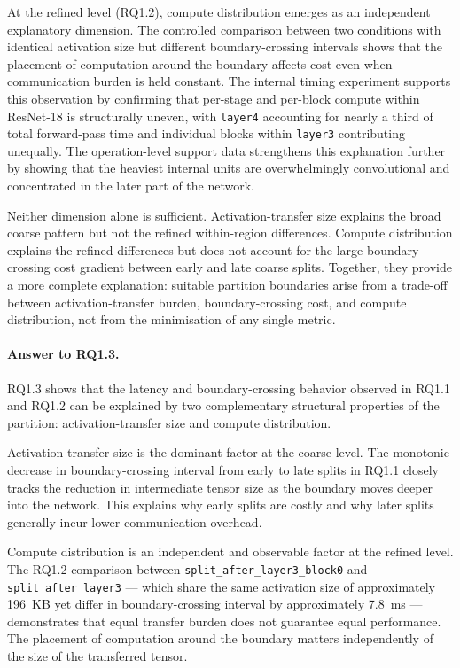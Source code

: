At the refined level (RQ1.2), compute distribution emerges as an independent
explanatory dimension. The controlled comparison between two conditions with
identical activation size but different boundary-crossing intervals shows that
the placement of computation around the boundary affects cost even when
communication burden is held constant. The internal timing experiment supports
this observation by confirming that per-stage and per-block compute within
ResNet-18 is structurally uneven, with \texttt{layer4} accounting for nearly a
third of total forward-pass time and individual blocks within \texttt{layer3}
contributing unequally. The operation-level support data strengthens this
explanation further by showing that the heaviest internal units are
overwhelmingly convolutional and concentrated in the later part of the network.

Neither dimension alone is sufficient. Activation-transfer size explains the
broad coarse pattern but not the refined within-region differences. Compute
distribution explains the refined differences but does not account for the
large boundary-crossing cost gradient between early and late coarse splits.
Together, they provide a more complete explanation: suitable partition
boundaries arise from a trade-off between activation-transfer burden,
boundary-crossing cost, and compute distribution, not from the minimisation of
any single metric.

\paragraph{Answer to RQ1.3.}
RQ1.3 shows that the latency and boundary-crossing behavior observed in RQ1.1
and RQ1.2 can be explained by two complementary structural properties of the
partition: activation-transfer size and compute distribution.

Activation-transfer size is the dominant factor at the coarse level. The
monotonic decrease in boundary-crossing interval from early to late splits in
RQ1.1 closely tracks the reduction in intermediate tensor size as the boundary
moves deeper into the network. This explains why early splits are costly and
why later splits generally incur lower communication overhead.

Compute distribution is an independent and observable factor at the refined
level. The RQ1.2 comparison between \texttt{split\_after\_layer3\_block0} and
\texttt{split\_after\_layer3} --- which share the same activation size of
approximately 196~KB yet differ in boundary-crossing interval by
approximately 7.8~ms --- demonstrates that equal transfer burden does not
guarantee equal performance. The placement of computation around the boundary matters
independently of the size of the transferred tensor.


